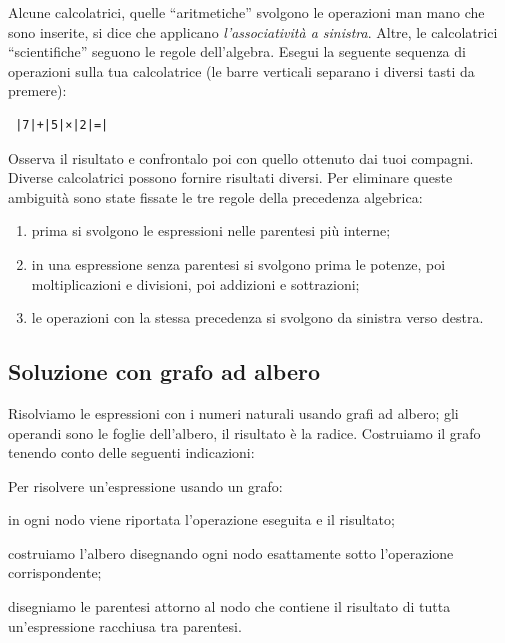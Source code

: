\osservazione Alcune calcolatrici, quelle ``aritmetiche'' svolgono le 
operazioni man mano che sono inserite, si dice che applicano 
\emph{l'associatività a sinistra}. Altre, le calcolatrici ``scientifiche'' 
seguono le regole dell'algebra. Esegui la seguente sequenza di operazioni 
sulla tua calcolatrice 
(le barre verticali separano i diversi tasti da premere):

\begin{verbatim}
 |7|+|5|×|2|=|
\end{verbatim} 

Osserva il risultato e confrontalo poi con quello ottenuto dai tuoi 
compagni.
Diverse calcolatrici possono fornire risultati diversi.
Per eliminare queste ambiguità sono state fissate le tre regole della 
precedenza algebrica:

\begin{enumerate}
 \item prima si svolgono le espressioni nelle parentesi più interne; 
 \item in una espressione senza parentesi si svolgono prima le potenze, 
  poi moltiplicazioni e divisioni, poi addizioni e sottrazioni;
 \item le operazioni con la stessa precedenza si svolgono da sinistra verso 
  destra.
\end{enumerate}

\subsection{Soluzione con grafo ad albero}

Risolviamo le espressioni con i numeri naturali usando grafi ad albero;
gli operandi sono le foglie dell'albero, il risultato è la radice. 
Costruiamo il grafo tenendo conto delle seguenti indicazioni:

\begin{procedura}
 Per risolvere un'espressione usando un grafo:
\begin{enumerate*}
 \item in ogni nodo viene riportata l'operazione eseguita e il risultato;
 \item costruiamo l'albero disegnando ogni nodo esattamente sotto
  l'operazione corrispondente;
 \item disegniamo le parentesi attorno al nodo che contiene il
  risultato di tutta un'espressione racchiusa tra parentesi.
\end{enumerate*}
\end{procedura}

